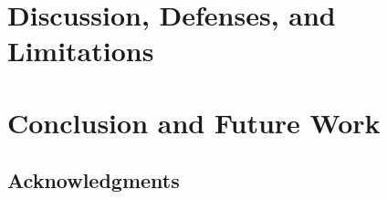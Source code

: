 \documentclass[12pt]{article}
\begin{document}
\section{Discussion, Defenses, and Limitations}


\section{Conclusion and Future Work}



\clearpage
{}
\begingroup
\small
\nocite{ragpoisonlab_repo}


\endgroup

\clearpage
\begin{center}
\section*{Acknowledgments}
\end{center}

\end{document}

